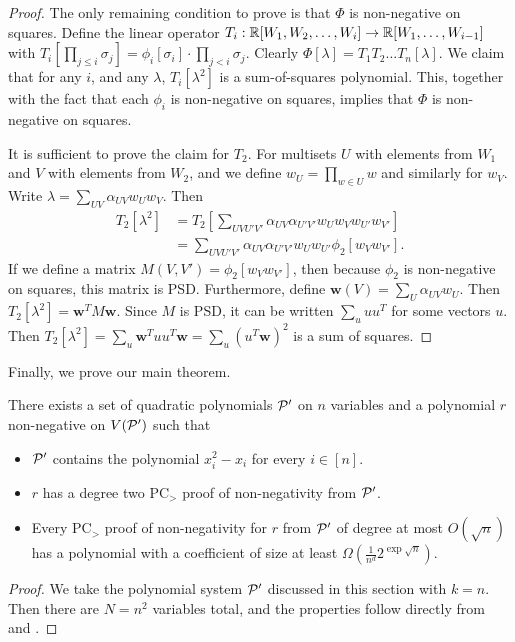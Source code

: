 \begin{proof}
The only remaining condition to prove is that $\Phi$ is non-negative on squares. Define the linear operator $T_i: \mathbb R[W_1, W_2,\dots,W_i] \rightarrow \mathbb R[W_1,\dots,W_{i-1}]$ with $T_i[\prod_{j\leq i} \sigma_j] = \phi_i[\sigma_i] \cdot \prod_{j < i} \sigma_j$. Clearly $\Phi[\lambda] = T_1T_2\dots T_n[\lambda]$. We claim that for any $i$, and any $\lambda$, $T_i[\lambda^2]$ is a sum-of-squares polynomial. This, together with the fact that each $\phi_i$ is non-negative on squares, implies that $\Phi$ is non-negative on squares.

It is sufficient to prove the claim for $T_2$. For multisets $U$ with elements from $W_1$ and $V$ with elements from $W_2$, and we define $w_U = \prod_{w \in U} w$ and similarly for $w_V$. Write $\lambda = \sum_{UV} \alpha_{UV}w_Uw_V$. Then
\begin{align*}
T_2[\lambda^2] &= T_2\left[\sum_{UVU'V'} \alpha_{UV}\alpha_{U'V'} w_Uw_Vw_{U'}w_{V'}\right] \\
&= \sum_{UVU'V'} \alpha_{UV}\alpha_{U'V'}w_{U}w_{U'}\phi_2[w_Vw_{V'}].
\end{align*}
If we define a matrix $M(V,V') = \phi_2[w_Vw_{V'}]$, then because $\phi_2$ is non-negative on squares, this matrix is PSD. Furthermore, define $\mathbf{w}(V) = \sum_U \alpha_{UV}w_U$. Then $T_2[\lambda^2] = \mathbf{w}^TM\mathbf{w}$. Since $M$ is PSD, it can be written $\sum_u uu^T$ for some vectors $u$. Then $T_2[\lambda^2] = \sum_u \mathbf{w}^Tuu^T\mathbf{w} = \sum_u (u^T\mathbf{w})^2$ is a sum of squares. 
\end{proof}

Finally, we prove our main theorem.
\begin{theorem}
There exists a set of quadratic polynomials $\mathcal P'$ on $n$ variables and a polynomial $r$ non-negative on $V(\mathcal P')$ such that
\begin{itemize}
\item $\mathcal P'$ contains the polynomial $x_i^2 - x_i$ for every $i \in [n]$.
\item $r$ has a degree two PC$_>$ proof of non-negativity from $\mathcal P'$. 
\item Every PC$_>$ proof of non-negativity for $r$ from $\mathcal P'$ of degree at most $O(\sqrt{n})$ has a polynomial with a coefficient of size at least $\Omega(\frac{1}{n^d}2^{\exp \sqrt{n}})$.
\end{itemize}
\end{theorem}
\begin{proof}
We take the polynomial system $\mathcal P'$ discussed in this section with $k = n$. Then there are $N = n^2$ variables total, and the properties follow directly from  and .
\end{proof}